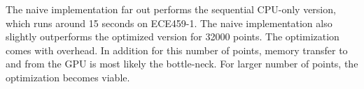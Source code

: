 \documentclass[12pt]{article}
\begin{document}
The naive implementation far out performs the sequential CPU-only version, which runs 
around 15 seconds on ECE459-1. The naive implementation also slightly outperforms the 
optimized version for 32000 points. The optimization comes with overhead. In addition for 
this number of points, memory transfer to and from the GPU is most likely
the bottle-neck. For larger number of points, the optimization becomes viable.
\end{document}
